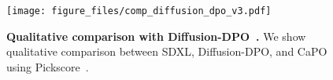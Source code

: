 \begin{figure}[t]
    \small\centering
    \texttt{[image: figure\_files/comp\_diffusion\_dpo\_v3.pdf]}
    \caption{
    \textbf{Qualitative comparison with Diffusion-DPO~\citep{wallace2023diffusion}.} 
    We show qualitative comparison between SDXL, Diffusion-DPO, and CaPO using Pickscore~\citep{kirstain2023pick}. 
    }
    \label{fig:diffdpocomp}
    \vspace{-10pt}
\end{figure}